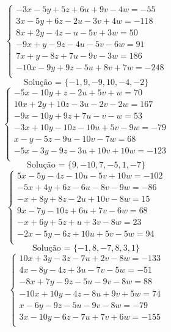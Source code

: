 \documentclass[12pt,oneside,a4paper]{article}
\begin{document}
\vspace{\baselineskip}
\begin{equation*}
\begin{cases}
-3x-5y+5z+6u+9v-4w=-55 \\
3x-5y+6z-2u-3v+4w=-118 \\
8x+2y-4z-u-5v+3w=50 \\
-9x+y-9z-4u-5v-6w=91 \\
7x+y-8z+7u-9v-3w=186 \\
-10x-9y+9z-5u+8v+7w=-248 \\
\end{cases}
\end{equation*}
\begin{equation*}
\text{Solução = }\{-1,9,-9,10,-4,-2\}
\end{equation*}
\vspace{\baselineskip}
\begin{equation*}
\begin{cases}
-5x-10y+z-2u+5v+w=70 \\
10x+2y+10z-3u-2v-2w=167 \\
-9x-10y+9z+7u-v-w=53 \\
-3x+10y-10z-10u+5v-9w=-79 \\
x-y-5z-9u-10v-7w=68 \\
-5x-3y-9z-3u+10v+10w=-123 \\
\end{cases}
\end{equation*}
\begin{equation*}
\text{Solução = }\{9,-10,7,-5,1,-7\}
\end{equation*}
\vspace{\baselineskip}
\begin{equation*}
\begin{cases}
5x-5y-4z-10u-5v+10w=-102 \\
-5x+4y+6z-6u-8v-9w=-86 \\
-x+8y+8z-2u+10v-8w=15 \\
9x-7y-10z+6u+7v-6w=68 \\
-x+6y+5z+u+3v-8w=23 \\
-2x-5y-6z+10u+5v-5w=94 \\
\end{cases}
\end{equation*}
\begin{equation*}
\text{Solução = }\{-1,8,-7,8,3,1\}
\end{equation*}
\vspace{\baselineskip}
\begin{equation*}
\begin{cases}
10x+3y-3z-7u+2v-8w=-133 \\
4x-8y-4z+3u-7v-5w=-51 \\
-8x+7y-9z-5u-9v-8w=88 \\
-10x+10y-4z-8u+9v+5w=74 \\
x-6y-9z-5u-9v-8w=-79 \\
3x-10y-6z-7u+7v+6w=-155 \\
\end{cases}
\end{equation*}
\end{document}
